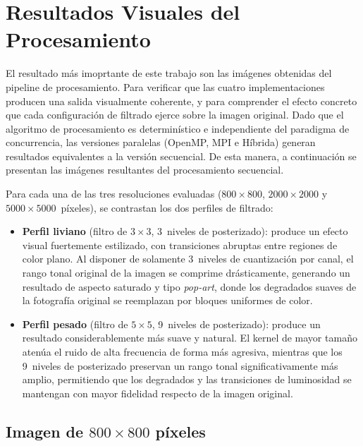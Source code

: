 \chapter{Resultados Visuales del Procesamiento}

El resultado más imoprtante de este trabajo son las imágenes obtenidas del pipeline de procesamiento. Para verificar que las cuatro implementaciones producen una salida visualmente coherente, y para comprender el efecto concreto que cada configuración de filtrado ejerce sobre la imagen original. Dado que el algoritmo de procesamiento es determinístico e independiente del paradigma de concurrencia, las versiones paralelas (OpenMP, MPI e Híbrida) generan resultados equivalentes a la versión secuencial. De esta manera, a continuación se presentan las imágenes resultantes del procesamiento secuencial.

Para cada una de las tres resoluciones evaluadas ($800 \times 800$, $2000 \times 2000$ y $5000 \times 5000$~píxeles), se contrastan los dos perfiles de filtrado:

\begin{itemize}
    \item \textbf{Perfil liviano} (filtro de $3 \times 3$, 3~niveles de posterizado): produce un efecto visual fuertemente estilizado, con transiciones abruptas entre regiones de color plano. Al disponer de solamente 3~niveles de cuantización por canal, el rango tonal original de la imagen se comprime drásticamente, generando un resultado de aspecto saturado y tipo \textit{pop-art}, donde los degradados suaves de la fotografía original se reemplazan por bloques uniformes de color.
    \item \textbf{Perfil pesado} (filtro de $5 \times 5$, 9~niveles de posterizado): produce un resultado considerablemente más suave y natural. El kernel de mayor tamaño atenúa el ruido de alta frecuencia de forma más agresiva, mientras que los 9~niveles de posterizado preservan un rango tonal significativamente más amplio, permitiendo que los degradados y las transiciones de luminosidad se mantengan con mayor fidelidad respecto de la imagen original.
\end{itemize}


\section{Imagen de \texorpdfstring{$800 \times 800$}{800x800} píxeles}

